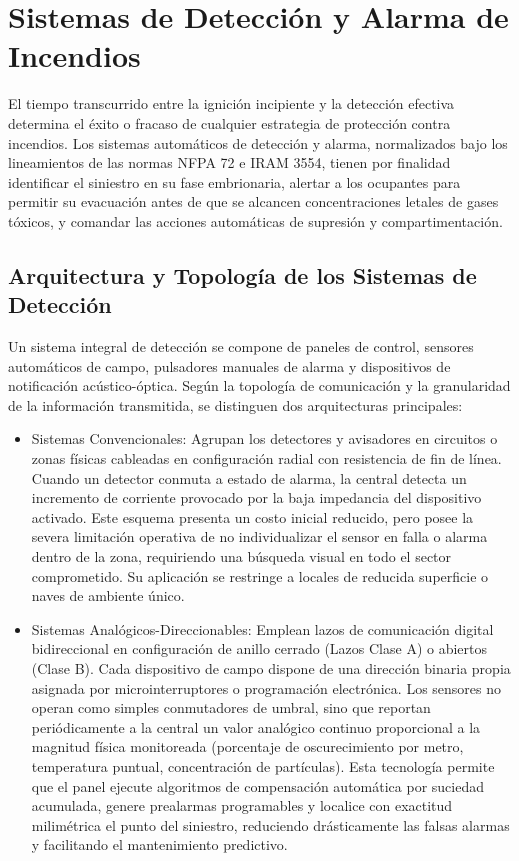 \chapter{Sistemas de Detección y Alarma de Incendios}
\label{sec.cap5:sistemas_deteccion}

El tiempo transcurrido entre la ignición incipiente y la detección efectiva determina el éxito o fracaso de cualquier
estrategia de protección contra incendios. Los sistemas automáticos de detección y alarma, normalizados bajo los
lineamientos de las normas NFPA 72 e IRAM 3554, tienen por finalidad identificar el siniestro en su fase embrionaria,
alertar a los ocupantes para permitir su evacuación antes de que se alcancen concentraciones letales de gases tóxicos, y
comandar las acciones automáticas de supresión y compartimentación.

\section{Arquitectura y Topología de los Sistemas de Detección}

Un sistema integral de detección se compone de paneles de control, sensores
automáticos de campo, pulsadores manuales de alarma y dispositivos de notificación acústico-óptica. Según la topología de
comunicación y la granularidad de la información transmitida, se distinguen dos arquitecturas principales:

\begin{itemize}
    \item Sistemas Convencionales: Agrupan los detectores y avisadores en circuitos o zonas físicas cableadas en
          configuración radial con resistencia de fin de línea. Cuando un detector conmuta a estado de alarma, la central
          detecta un incremento de corriente provocado por la baja impedancia del dispositivo activado. Este esquema
          presenta un costo inicial reducido, pero posee la severa limitación operativa de no individualizar el sensor en
          falla o alarma dentro de la zona, requiriendo una búsqueda visual en todo el sector comprometido. Su aplicación se
          restringe a locales de reducida superficie o naves de ambiente único.
    \item Sistemas Analógicos-Direccionables: Emplean lazos de comunicación digital bidireccional en configuración de
          anillo cerrado (Lazos Clase A) o abiertos (Clase B). Cada dispositivo de campo dispone de una dirección binaria
          propia asignada por microinterruptores o programación electrónica. Los sensores no operan como simples
          conmutadores de umbral, sino que reportan periódicamente a la central un valor analógico continuo proporcional a
          la magnitud física monitoreada (porcentaje de oscurecimiento por metro, temperatura puntual, concentración de
          partículas). Esta tecnología permite que el panel ejecute algoritmos de compensación automática por suciedad
          acumulada, genere prealarmas programables y localice con exactitud milimétrica el punto del siniestro,
          reduciendo drásticamente las falsas alarmas y facilitando el mantenimiento predictivo.
\end{itemize}

